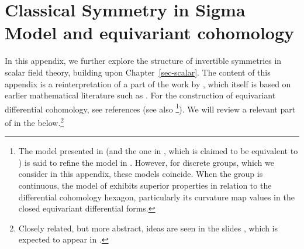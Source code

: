 \documentclass[11pt,toc=bibliography]{scrbook}
\numberwithin{equation}{section}
\begin{document}
\chapter{Classical Symmetry in Sigma Model and equivariant
cohomology}\label{sec-equivariant}

In this appendix, we further explore the structure of invertible
symmetries in scalar field theory, building upon
Chapter~\ref{sec-scalar}. The content of this appendix is a
reinterpretation of a part of the work by \autocite{Davighi:2020vcm},
which itself is based on earlier mathematical literature such as
\autocite{Freed:2006mx}. For the construction of equivariant
differential cohomology, see references
\autocite{kubel2018equivariant,redden2016differential} (see also
\autocite{gomi2005equivariant}\footnote{The model presented in
  \autocite{kubel2018equivariant} (and the one in
  \autocite{redden2016differential}, which is claimed to be equivalent
  to \autocite{kubel2018equivariant}) is said to refine the model in
  \autocite{gomi2005equivariant}. However, for discrete groups, which we
  consider in this appendix, these models coincide. When the group is
  continuous, the model of \autocite{kubel2018equivariant} exhibits
  superior properties in relation to the differential cohomology
  hexagon, particularly its curvature map values in the closed
  equivariant differential forms.}). We will review a relevant part of
\autocite{kubel2018equivariant} in the below.\footnote{Closely related,
  but more abstract, ideas are seen in the slides \autocite{SatiSlides},
  which is expected to appear in \autocite{SatiSchreiberTED}.}
\end{document}
